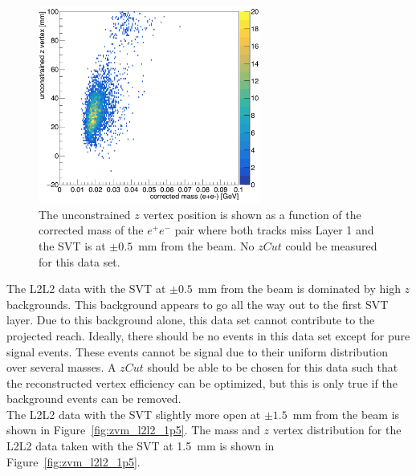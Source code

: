 \begin{figure}[htb]
  \centering
      \includegraphics[width=0.65\textwidth]{pics/appendix/zVm_L2L2.png}
      \caption[$z$ vertex and mass distribution for the L2L2 data set with the SVT at $\pm0.5$~mm]{The unconstrained $z$ vertex position is shown as a function of the corrected mass of the $e^+e^-$ pair where both tracks miss Layer 1 and the SVT is at $\pm0.5$~mm from the beam. No $zCut$ could be measured for this data set.}
  \label{fig:zvm_l2l2}
\end{figure}
The L2L2 data with the SVT at $\pm0.5$~mm from the beam is dominated by high $z$ backgrounds. This background appears to go all the way out to the first SVT layer. Due to this background alone, this data set cannot contribute to the projected reach. Ideally, there should be no events in this data set except for pure signal events. These events cannot be signal due to their uniform distribution over several masses. A $zCut$ should be able to be chosen for this data such that the reconstructed vertex efficiency can be optimized, but this is only true if the background events can be removed. \\
\indent The L2L2 data with the SVT slightly more open at $\pm1.5$~mm from the beam is shown in Figure~\ref{fig:zvm_l2l2_1p5}. The mass and $z$ vertex distribution for the L2L2 data taken with the SVT at 1.5~mm is shown in Figure~\ref{fig:zvm_l2l2_1p5}.

